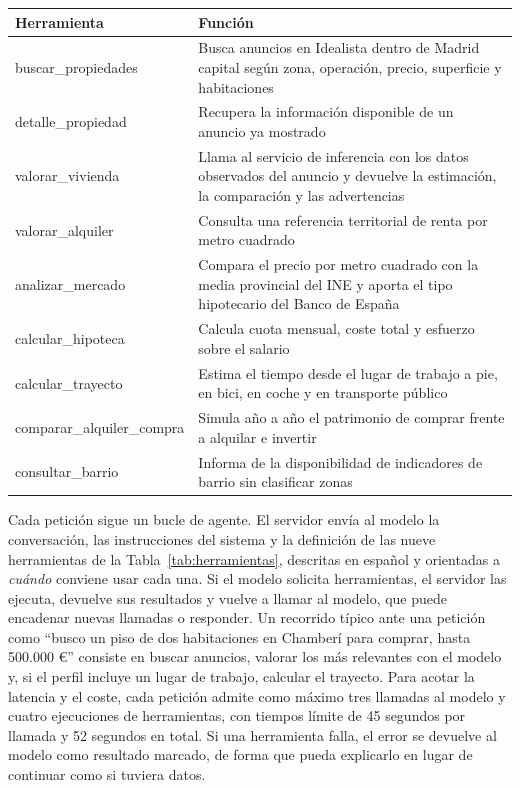 \documentclass[11pt,a4paper]{article}
\newcommand{\thead}[1]{\textbf{#1}}
\begin{document}
\begingroup
\renewcommand{\thetable}{A1}
\begin{center}
\label{tab:herramientas}
\begin{tabularx}{\linewidth}{@{}l L@{}}
\toprule
\thead{Herramienta} & \thead{Función} \\
\midrule
buscar\_propiedades & Busca anuncios en Idealista dentro de Madrid capital según zona, operación, precio, superficie y habitaciones \\
detalle\_propiedad & Recupera la información disponible de un anuncio ya mostrado \\
valorar\_vivienda & Llama al servicio de inferencia con los datos observados del anuncio y devuelve la estimación, la comparación y las advertencias \\
valorar\_alquiler & Consulta una referencia territorial de renta por metro cuadrado \\
analizar\_mercado & Compara el precio por metro cuadrado con la media provincial del INE y aporta el tipo hipotecario del Banco de España \\
calcular\_hipoteca & Calcula cuota mensual, coste total y esfuerzo sobre el salario \\
calcular\_trayecto & Estima el tiempo desde el lugar de trabajo a pie, en bici, en coche y en transporte público \\
comparar\_alquiler\_compra & Simula año a año el patrimonio de comprar frente a alquilar e invertir \\
consultar\_barrio & Informa de la disponibilidad de indicadores de barrio sin clasificar zonas \\
\bottomrule
\end{tabularx}
\end{center}
\endgroup

Cada petición sigue un bucle de agente. El servidor envía al modelo la conversación, las instrucciones del sistema y la definición de las nueve herramientas de la Tabla~\ref{tab:herramientas}, descritas en español y orientadas a \emph{cuándo} conviene usar cada una. Si el modelo solicita herramientas, el servidor las ejecuta, devuelve sus resultados y vuelve a llamar al modelo, que puede encadenar nuevas llamadas o responder. Un recorrido típico ante una petición como ``busco un piso de dos habitaciones en Chamberí para comprar, hasta 500.000 €'' consiste en buscar anuncios, valorar los más relevantes con el modelo y, si el perfil incluye un lugar de trabajo, calcular el trayecto. Para acotar la latencia y el coste, cada petición admite como máximo tres llamadas al modelo y cuatro ejecuciones de herramientas, con tiempos límite de 45 segundos por llamada y 52 segundos en total. Si una herramienta falla, el error se devuelve al modelo como resultado marcado, de forma que pueda explicarlo en lugar de continuar como si tuviera datos.
\end{document}
